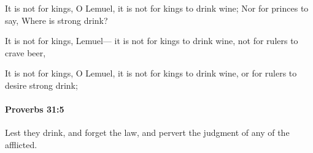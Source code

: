 			\begin{versebox}
					\item[BHS] 
					\item[ASV] It is not for kings, O Lemuel, it is not for kings to drink wine; Nor for princes to say, Where is strong drink?
					\item[NIV] It is not for kings, Lemuel— it is not for kings to drink wine, not for rulers to crave beer,
					\item[NRSV] It is not for kings, O Lemuel, it is not for kings to drink wine, or for rulers to desire strong drink;
			\end{versebox}

		\paragraph{Proverbs 31:5} %
			\label{PROVERBS-31-5}

			Lest they drink, and forget the law, and pervert the judgment of any of the afflicted.

